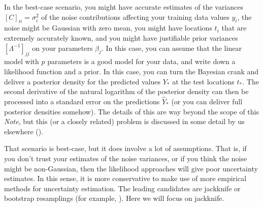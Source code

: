 \documentclass[12pt,letterpaper]{article}
\newcommand{\documentname}{\textsl{Note}}
\begin{document}
In the best-case scenario, you might have accurate estimates of the variances $[C]_{ii} = \sigma_i^2$ of the noise contributions affecting your training data values $y_i$, the noise might be Gaussian with zero mean, you might have locations $t_i$ that are extremely accurately known, and you might have justifiable prior variances $[\Lambda^{-1}]_{jj}$ on your parameters $\beta_j$.
In this case, you can assume that the linear model with $p$ parameters is a good model for your data, and write down a likelihood function and a prior.
In this case, you can turn the Bayesian crank and deliver a posterior density for the predicted values $Y_\ast$ at the test locations $t_\ast$.
The second derivative of the natural logarithm of the posterior density can then be processed into a standard error on the predictions $\hat{Y}_\ast$ (or you can deliver full posterior densities somehow).
The details of this are way beyond the scope of this \documentname, but this (or a closely related) problem is discussed in some detail by us elsewhere (\citealt{products}).

That scenario is best-case, but it does involve a lot of assumptions.
That is, if you don't trust your estimates of the noise variances, or if you think the noise might be non-Gaussian, then the likelihood approaches will give poor uncertainty estimates.
In this sense, it is more conservative to make use of more empirical methods for uncertainty estimation.
The leading candidates are jackknife or bootstrap resamplings (for example, \citealt{bootjack}).
Here we will focus on jackknife.
\end{document}
